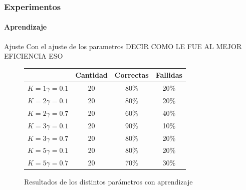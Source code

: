 \documentclass{beamer}
\begin{document}
\begin{frame}
  \frametitle{Experimentos}
  \framesubtitle{Aprendizaje}
  \begin{block}{Ajuste}
		Con el ajuste de los parametros
		DECIR COMO LE FUE AL MEJOR EFICIENCIA  ESO
		\end{block}

\begin{figure}
\centering
\begin{tabular}{|c|c|c|c|}
\hline 
& Cantidad & Correctas & Fallidas \\ 
\hline 
$K = 1  \gamma = 0.1$ & 20 & 80\% & 20\% \\ 
\hline 
$K = 2  \gamma = 0.1$ & 20 & 80\% & 20\% \\ 
\hline 
$K = 2  \gamma = 0.7$ & 20 & 60\% & 40\% \\ 
\hline 
$K = 3  \gamma = 0.1$ & 20 & 90\% & 10\% \\ 
\hline 
$K = 3  \gamma = 0.7$ & 20 & 80\% & 20\% \\ 
\hline 
$K = 5  \gamma = 0.1$ & 20 & 80\% & 20\% \\ 
\hline  
$K = 5  \gamma = 0.7$ & 20 & 70\% & 30\% \\ 
\hline 

\end{tabular} 

\caption{Resultados de los distintos par\'ametros con aprendizaje}
\label{tabla:entramientos}


\end{figure}

\end{frame}
\end{document}
